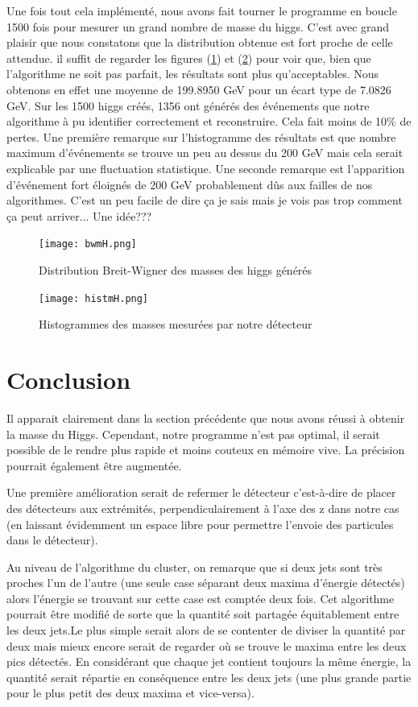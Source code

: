 \documentclass[11pt]{article}
\begin{document}
Une fois tout cela implémenté, nous avons fait tourner le programme en boucle
1500 fois pour mesurer un grand nombre de masse du higgs. C'est avec grand
plaisir que nous constatons que la distribution obtenue est fort proche de celle
attendue. il suffit de regarder les figures (\ref{bw}) et (\ref{hist}) pour voir
que, bien que l'algorithme ne soit pas parfait, les résultats sont plus
qu'acceptables. Nous obtenons en effet une moyenne de 199.8950 GeV pour un
écart type de 7.0826 GeV. Sur les 1500 higgs créés, 1356 ont générés des
événements que notre algorithme à pu identifier correctement et reconstruire.
Cela fait moins de 10\% de pertes. Une première remarque sur l'histogramme des
résultats est que nombre maximum d'événements se trouve un peu au dessus du 200
GeV mais cela serait explicable par une fluctuation statistique. Une seconde
remarque est l'apparition d'événement fort éloignés de 200 GeV probablement dûs
aux failles de nos algorithmes. C'est un peu facile de dire ça je sais mais je
vois pas trop comment ça peut arriver... Une idée???

\begin{figure}
\caption{Distribution Breit-Wigner des masses des higgs générés}
\texttt{[image: bwmH.png]}
\label{bw}
\end{figure}

\begin{figure}
\caption{Histogrammes des masses mesurées par notre détecteur}
\texttt{[image: histmH.png]}
\label{hist}
\end{figure}


\newpage
\section{Conclusion}
 Il apparait clairement dans la section pr\'ec\'edente que nous avons r\'eussi \`a obtenir la masse du Higgs.
Cependant, notre programme n'est pas optimal, il serait possible de le rendre plus rapide et 
moins couteux en m\'emoire vive. La pr\'ecision pourrait \'egalement être augment\'ee. 

Une première amélioration serait de refermer le d\'etecteur c'est-à-dire de placer des d\'etecteurs aux extrémités, 
perpendiculairement à l'axe des z dans notre cas (en laissant évidemment un espace libre pour permettre l'envoie des 
particules dans le d\'etecteur). 

Au niveau de l'algorithme du cluster, on remarque que si deux jets sont très proches l'un de l'autre (une seule case 
s\'eparant deux maxima d'énergie détectés) alors l'énergie se trouvant sur cette
case est comptée deux fois. Cet algorithme
 pourrait être modifié de sorte que la quantité soit partagée équitablement
entre les deux jets.Le plus simple serait
alors de se contenter de diviser la quantité par deux mais mieux encore serait de regarder où se trouve le 
maxima entre les deux pics détectés. En considérant que chaque jet contient toujours la même énergie, la quantité serait
répartie en conséquence entre les deux jets (une plus grande partie pour le plus
petit des deux maxima et vice-versa). 
\end{document}
